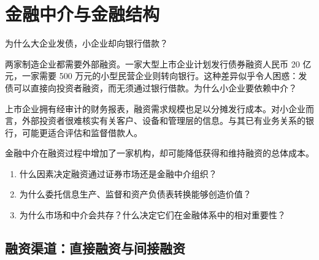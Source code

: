 \chapter{金融中介与金融结构}
\label{chap:Financial_Intermediation_and_Financial_Structure}

\begin{openingcase}{为什么大企业发债，小企业却向银行借款？}

两家制造企业都需要外部融资。一家大型上市企业计划发行债券融资人民币 20 亿元，一家需要 500 万元的小型民营企业则转向银行。这种差异似乎令人困惑：发债可以直接向投资者融资，而无须通过银行借款。为什么小企业要依赖中介？

上市企业拥有经审计的财务报表，融资需求规模也足以分摊发行成本。对小企业而言，外部投资者很难核实有关客户、设备和管理层的信息。与其已有业务关系的银行，可能更适合评估和监督借款人。

金融中介在融资过程中增加了一家机构，却可能降低获得和维持融资的总体成本。

\end{openingcase}


\begin{tcolorbox}[
  enhanced,
  colback=FinanceBlue!6,
  colframe=FinanceBlue,
  boxrule=0.6pt,
  sharp corners,
  left=8pt,
  right=8pt,
  top=7pt,
  bottom=7pt,
  before skip=1em,
  after skip=1.6em,
  title=\textbf{核心问题},
  coltitle=white,
  colbacktitle=FinanceBlue,
  fonttitle=\bfseries,
  attach boxed title to top left={xshift=6pt,yshift=-2mm},
  boxed title style={
    boxrule=0pt,
    sharp corners,
    left=5pt,
    right=5pt,
    top=2pt,
    bottom=2pt
  }
]
\begin{enumerate}[
  leftmargin=*,
  label=\textcolor{FinanceBlue}{\textbf{\arabic*.}},
  itemsep=0.55em,
  topsep=0.2em
]
\item 什么因素决定融资通过证券市场还是金融中介组织？

\item 为什么委托信息生产、监督和资产负债表转换能够创造价值？

\item 为什么市场和中介会共存？什么决定它们在金融体系中的相对重要性？

\end{enumerate}
\end{tcolorbox}

\section{融资渠道：直接融资与间接融资}

